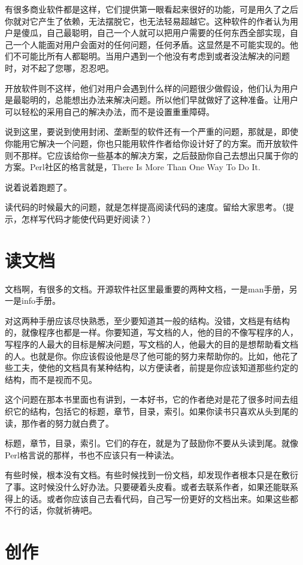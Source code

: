 \documentclass[10pt]{article}
\begin{document}
\begin{CJK*}{UTF8}{simsun}
有很多商业软件都是这样，它们提供第一眼看起来很好的功能，可是用久了之后
你就对它产生了依赖，无法摆脱它，也无法轻易超越它。这种软件的作者认为用
户是傻瓜，自己最聪明，自己一个人就可以把用户需要的任何东西全部实现，自
己一个人能面对用户会面对的任何问题，任何矛盾。这显然是不可能实现的。他
们不可能比所有人都聪明。当用户遇到一个他没有考虑到或者没法解决的问题
时，对不起了您哪，忍忍吧。

开放软件则不这样，他们对用户会遇到什么样的问题很少做假设，他们认为用户
是最聪明的，总能想出办法来解决问题。所以他们早就做好了这种准备。让用户
可以轻松的采用自己的解决办法，而不是设置重重障碍。

说到这里，要说到使用封闭、垄断型的软件还有一个严重的问题，那就是，即使
你能用它解决一个问题，你也只能用软件作者给你设计好了的方案。而开放软件
则不那样。它应该给你一些基本的解决方案，之后鼓励你自己去想出只属于你的
方案。Perl社区的格言就是，There Is More Than One Way To Do It.

说着说着跑题了。

读代码的时候最大的问题，就是怎样提高阅读代码的速度。留给大家思考。（提
  示，怎样写代码才能使代码更好阅读？）

\section{读文档}

文档啊，有很多的文档。开源软件社区里最重要的两种文档，一是man手册，另
一是info手册。

对这两种手册应该尽快熟悉，至少要知道其一般的结构。没错，文档是有结构
的，就像程序也都是一样。你要知道，写文档的人，他的目的不像写程序的人，
写程序的人最大的目标是解决问题，写文档的人，他最大的目的是想帮助看文档
的人。也就是你。你应该假设他是尽了他可能的努力来帮助你的。比如，他花了
些工夫，使他的文档具有某种结构，以方便读者，前提是你应该知道那些约定的
结构，而不是视而不见。

这个问题在那本书里面也有讲到，一本好书，它的作者绝对是花了很多时间去组
织它的结构，包括它的标题，章节，目录，索引。如果你读书只喜欢从头到尾的
读，那作者的努力就白费了。

标题，章节，目录，索引。它们的存在，就是为了鼓励你不要从头读到尾。就像
Perl格言说的那样，书也不应该只有一种读法。

有些时候，根本没有文档。有些时候找到一份文档，却发现作者根本只是在敷衍
了事。这时候没什么好办法。只要硬着头皮看。或者去联系作者，如果还能联系
得上的话。或者你应该自己去看代码，自己写一份更好的文档出来。如果这些都
不行的话，你就祈祷吧。

\section{创作}


\end{CJK*}
\end{document}
